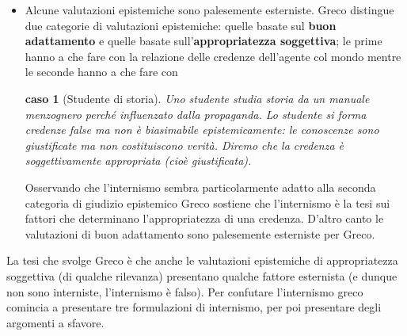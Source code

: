 \documentclass[10pt,a4paper]{article}
\newtheorem{caso}{caso}
\begin{document}
\begin{itemize}
	\item Alcune valutazioni epistemiche sono palesemente esterniste. Greco distingue due categorie di valutazioni epistemiche: quelle basate sul \textbf{buon adattamento} e quelle basate sull'\textbf{appropriatezza soggettiva}; le prime hanno a che fare con la relazione delle credenze dell'agente col mondo mentre le seconde hanno a che fare con 
	\begin{caso}[Studente di storia]
		Uno studente studia storia da un manuale menzognero perché influenzato dalla propaganda. Lo studente si forma credenze false ma non è biasimabile epistemicamente: le conoscenze sono giustificate ma non costituiscono verità. Diremo che la credenza è soggettivamente appropriata (cioè giustificata).
	\end{caso}
	Osservando che l'internismo sembra particolarmente adatto alla seconda categoria di giudizio epistemico Greco sostiene che l'internismo è la tesi sui fattori che determinano l'appropriatezza di una credenza. D'altro canto le valutazioni di buon adattamento sono palesemente esterniste per Greco. 
\end{itemize}
La tesi che svolge Greco è che anche le valutazioni epistemiche di appropriatezza soggettiva (di qualche rilevanza) presentano qualche fattore esternista (e dunque non sono interniste, l'internismo è falso). Per confutare l'internismo greco comincia a presentare tre formulazioni di internismo, per poi presentare degli argomenti a sfavore. 
\end{document}
